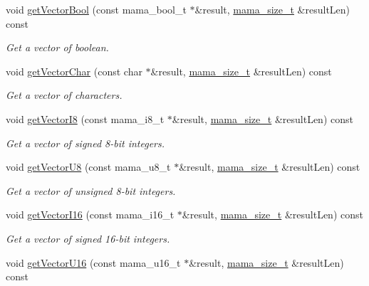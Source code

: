 \begin{DoxyCompactItemize}
void \hyperlink{classWombat_1_1MamaMsgField_af47ff9ee2d30cc56a6133d9b90923152}{getVectorBool} (const mama\_\-bool\_\-t $\ast$\&result, \hyperlink{classmama__size__t}{mama\_\-size\_\-t} \&resultLen) const 
\begin{DoxyCompactList}\small\item\em Get a vector of boolean. \item\end{DoxyCompactList}\item 
void \hyperlink{classWombat_1_1MamaMsgField_a8779a6a8bd574fdbbc00f3164f828bc4}{getVectorChar} (const char $\ast$\&result, \hyperlink{classmama__size__t}{mama\_\-size\_\-t} \&resultLen) const 
\begin{DoxyCompactList}\small\item\em Get a vector of characters. \item\end{DoxyCompactList}\item 
void \hyperlink{classWombat_1_1MamaMsgField_a08f245644d691bb7151ddb4fe2f673dc}{getVectorI8} (const mama\_\-i8\_\-t $\ast$\&result, \hyperlink{classmama__size__t}{mama\_\-size\_\-t} \&resultLen) const 
\begin{DoxyCompactList}\small\item\em Get a vector of signed 8-\/bit integers. \item\end{DoxyCompactList}\item 
void \hyperlink{classWombat_1_1MamaMsgField_afff950a7a5a182c91ac63e7f83d90431}{getVectorU8} (const mama\_\-u8\_\-t $\ast$\&result, \hyperlink{classmama__size__t}{mama\_\-size\_\-t} \&resultLen) const 
\begin{DoxyCompactList}\small\item\em Get a vector of unsigned 8-\/bit integers. \item\end{DoxyCompactList}\item 
void \hyperlink{classWombat_1_1MamaMsgField_ae79a9f90b23fb085ae8c29f49439e825}{getVectorI16} (const mama\_\-i16\_\-t $\ast$\&result, \hyperlink{classmama__size__t}{mama\_\-size\_\-t} \&resultLen) const 
\begin{DoxyCompactList}\small\item\em Get a vector of signed 16-\/bit integers. \item\end{DoxyCompactList}\item 
void \hyperlink{classWombat_1_1MamaMsgField_aafd3bf156070debc9236ad53501a1426}{getVectorU16} (const mama\_\-u16\_\-t $\ast$\&result, \hyperlink{classmama__size__t}{mama\_\-size\_\-t} \&resultLen) const 

\end{DoxyCompactItemize}
